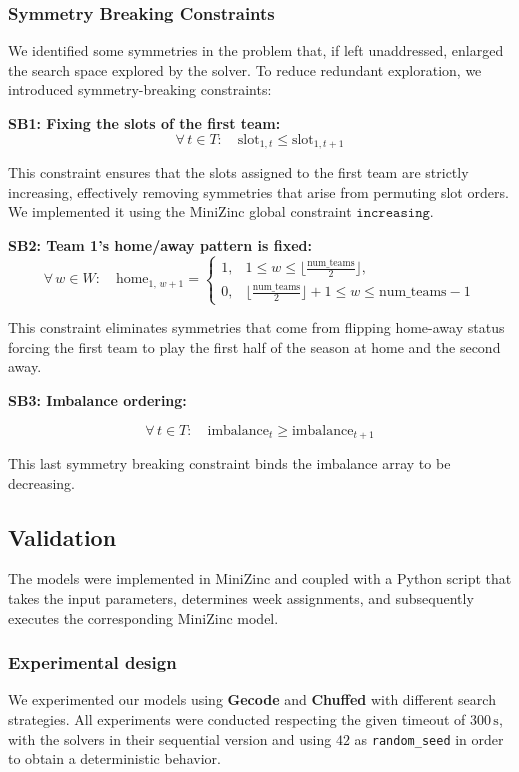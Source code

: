 \documentclass{article}
\begin{document}
\subsubsection*{Symmetry Breaking Constraints}
We identified some symmetries in the problem that, if left unaddressed,  enlarged the search space explored by the solver. To reduce redundant exploration, we introduced symmetry-breaking constraints:

\textbf{SB1: Fixing the slots of the first team:}
\[
\forall\, t \in T:\quad \text{slot}_{1,t} \le \text{slot}_{1,t+1}
\]

This constraint ensures that the slots assigned to the first team are strictly increasing, effectively removing symmetries that arise from permuting slot orders. We implemented it using the MiniZinc global constraint $\mathtt{increasing}.$

\textbf{SB2: Team 1's home/away pattern is fixed:}
\[
\forall\, w \in W:\quad
\text{home}_{1,\, w+1} =
\begin{cases}
1, & 1 \le w \le \lfloor \tfrac{\text{num\_teams}}{2} \rfloor,\\[2mm]
0, & \lfloor \tfrac{\text{num\_teams}}{2} \rfloor + 1 \le w \le \text{num\_teams}-1
\end{cases}
\]

This constraint eliminates symmetries that come from flipping home-away status forcing the first team to play the first half of the season at home and the second away.

\textbf{SB3: Imbalance ordering:}  

\[
\forall\, t \in T:\quad \text{imbalance}_t \ge \text{imbalance}_{t+1}
\]

This last symmetry breaking constraint binds the imbalance array to be decreasing.

\subsection{Validation}
The models were implemented in MiniZinc and coupled with a Python script that takes the input parameters, determines week assignments, and subsequently executes the corresponding MiniZinc model.

\subsubsection{Experimental design}
We experimented our models using \textbf{Gecode} and \textbf{Chuffed} with different search strategies. All experiments were conducted respecting the given timeout of $300\,\mathrm{s}$, with the solvers in their sequential version and using $42$ as \texttt{random\_seed} in order to obtain a deterministic behavior.
\end{document}
